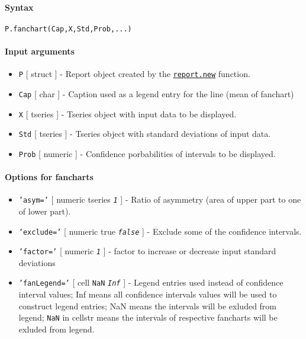 


	\paragraph{Syntax}

\begin{verbatim}
P.fanchart(Cap,X,Std,Prob,...)
\end{verbatim}

\paragraph{Input arguments}

\begin{itemize}
\item
  \texttt{P} {[} struct {]} - Report object created by the
  \href{report/new}{\texttt{report.new}} function.
\item
  \texttt{Cap} {[} char {]} - Caption used as a legend entry for the
  line (mean of fanchart)
\item
  \texttt{X} {[} tseries {]} - Tseries object with input data to be
  displayed.
\item
  \texttt{Std} {[} tseries {]} - Tseries object with standard deviations
  of input data.
\item
  \texttt{Prob} {[} numeric {]} - Confidence porbabilities of intervals
  to be displayed.
\end{itemize}

\paragraph{Options for fancharts}

\begin{itemize}
\item
  \texttt{'asym='} {[} numeric \textbar{} tseries \textbar{}
  \emph{\texttt{1}} {]} - Ratio of asymmetry (area of upper part to one
  of lower part).
\item
  \texttt{'exclude='} {[} numeric \textbar{} true \textbar{}
  \emph{\texttt{false}} {]} - Exclude some of the confidence intervals.
\item
  \texttt{'factor='} {[} numeric \textbar{} \emph{\texttt{1}} {]} -
  factor to increase or decrease input standard deviations
\item
  \texttt{'fanLegend='} {[} cell \textbar{} \texttt{NaN} \textbar{}
  \emph{\texttt{Inf}} {]} - Legend entries used instead of confidence
  interval values; Inf means all confidence intervals values will be
  used to construct legend entries; NaN means the intervals will be
  exluded from legend; \texttt{NaN} in cellstr means the intervals of
  respective fancharts will be exluded from legend.
\end{itemize}

